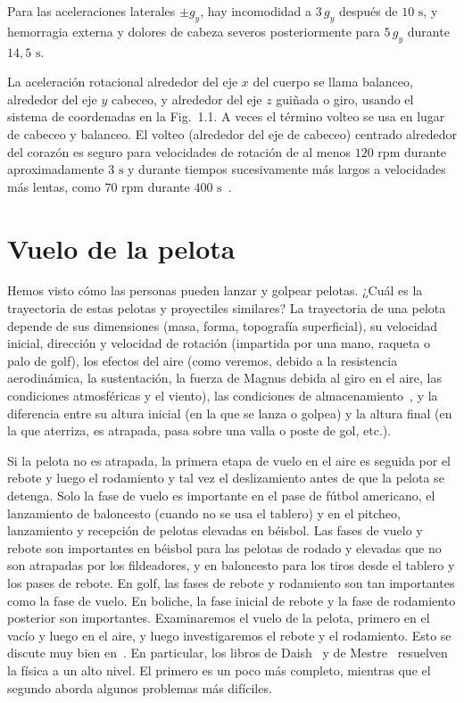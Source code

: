 \documentclass[12pt]{book}
\begin{document}
Para las aceleraciones laterales $\pm g_y$, hay incomodidad a $3\,g_y$ después de $10\text{ s}$, y hemorragia externa y dolores de cabeza severos posteriormente para $5\,g_y$ durante $14{,}5\text{ s}$.

La aceleración rotacional alrededor del eje $x$ del cuerpo se llama balanceo, alrededor del eje $y$ cabeceo, y alrededor del eje $z$ guiñada o giro, usando el sistema de coordenadas en la Fig.~1.1. A veces el término volteo se usa en lugar de cabeceo y balanceo. El volteo (alrededor del eje de cabeceo) centrado alrededor del corazón es seguro para velocidades de rotación de al menos $120\text{ rpm}$ durante aproximadamente $3\text{ s}$ y durante tiempos sucesivamente más largos a velocidades más lentas, como $70\text{ rpm}$ durante $400\text{ s}$~\cite{ref50,ref138}.

\section{Vuelo de la pelota}

Hemos visto cómo las personas pueden lanzar y golpear pelotas. ¿Cuál es la trayectoria de estas pelotas y proyectiles similares? La trayectoria de una pelota depende de sus dimensiones (masa, forma, topografía superficial), su velocidad inicial, dirección y velocidad de rotación (impartida por una mano, raqueta o palo de golf), los efectos del aire (como veremos, debido a la resistencia aerodinámica, la sustentación, la fuerza de Magnus debida al giro en el aire, las condiciones atmosféricas y el viento), las condiciones de almacenamiento~\cite{ref96}, y la diferencia entre su altura inicial (en la que se lanza o golpea) y la altura final (en la que aterriza, es atrapada, pasa sobre una valla o poste de gol, etc.).

Si la pelota no es atrapada, la primera etapa de vuelo en el aire es seguida por el rebote y luego el rodamiento y tal vez el deslizamiento antes de que la pelota se detenga. Solo la fase de vuelo es importante en el pase de fútbol americano, el lanzamiento de baloncesto (cuando no se usa el tablero) y en el pitcheo, lanzamiento y recepción de pelotas elevadas en béisbol. Las fases de vuelo y rebote son importantes en béisbol para las pelotas de rodado y elevadas que no son atrapadas por los fildeadores, y en baloncesto para los tiros desde el tablero y los pases de rebote. En golf, las fases de rebote y rodamiento son tan importantes como la fase de vuelo. En boliche, la fase inicial de rebote y la fase de rodamiento posterior son importantes. Examinaremos el vuelo de la pelota, primero en el vacío y luego en el aire, y luego investigaremos el rebote y el rodamiento. Esto se discute muy bien en~\cite{ref16,ref35,ref36,ref37,ref60,ref135}. En particular, los libros de Daish~\cite{ref36} y de Mestre~\cite{ref37} resuelven la física a un alto nivel. El primero es un poco más completo, mientras que el segundo aborda algunos problemas más difíciles.
\end{document}
